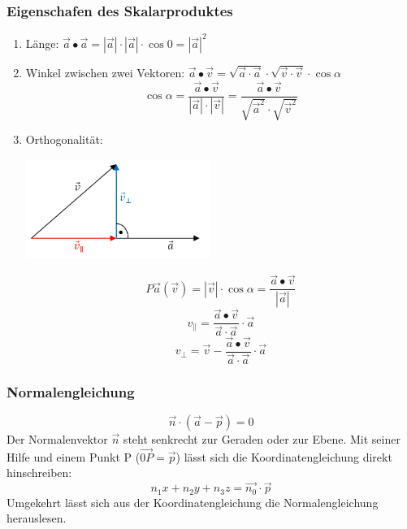 	\subsubsection{Eigenschafen des Skalarproduktes}
		\begin{enumerate}
			\item Länge: $\vec{a} \bullet \vec{a} = |\vec{a}|\cdot |\vec{a}| \cdot \cos0 = |\vec{a}|^2$
			\item Winkel zwischen zwei Vektoren: $\vec{a} \bullet \vec{v} = \sqrt{\vec{a}\cdot \vec{a}} \cdot \sqrt{\vec{v} \cdot \vec{v}} \cdot \cos\alpha$\\
				\begin{equation*}
					\cos\alpha = \frac{\vec{a}\bullet \vec{v}}{|\vec{a}| \cdot |\vec{v}|} = \frac{\vec{a}\bullet \vec{v}}{\sqrt{\vec{a}^2} \cdot \sqrt{\vec{v}^2}}
				\end{equation*}
			\item Orthogonalität: \\
				\begin{minipage}{6cm}
					\includegraphics[width=6cm]{pics/1_Projektion.png}
				\end{minipage}
				\begin{minipage}[c]{8cm}
					\begin{equation*} P\vec{a}(\vec{v}) = |\vec{v}|\cdot \cos\alpha = \frac{\vec{a}\bullet \vec{v}}{|\vec{a}|}\end{equation*}
					\begin{equation*} v_{\parallel} = \frac{\vec{a}\bullet \vec{v}}{\vec{a}\cdot \vec{a}}\cdot \vec{a}\end{equation*}
					\begin{equation*} v_{\perp} = \vec{v} - \frac{\vec{a}\bullet \vec{v}}{\vec{a}\cdot \vec{a}}\cdot \vec{a}\end{equation*}
				\end{minipage}
		\end{enumerate}

	\subsubsection{Normalengleichung}
		\begin{equation*}
			\vec{n} \cdot (\vec{a} - \vec{p}) = 0
		\end{equation*}
		Der Normalenvektor $\vec{n}$ steht senkrecht zur Geraden oder zur Ebene. Mit seiner Hilfe und einem Punkt P ($\vec{0P} = \vec{p}$) lässt sich
		die Koordinatengleichung direkt hinschreiben:
		\begin{equation*}
			n_1x + n_2y + n_3z = \vec{n_0} \cdot \vec{p}
		\end{equation*}
		Umgekehrt lässt sich aus der Koordinatengleichung die Normalengleichung herauslesen. \\

